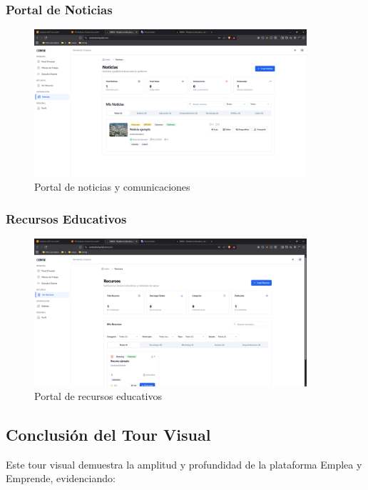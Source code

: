 \documentclass[12pt,a4paper]{article}
\begin{document}
\begin{enumerate}
\subsubsection{Portal de Noticias}
\begin{figure}[H]
    \centering
    \includegraphics[width=0.9\textwidth]{screenshots/features/news.png}
    \caption{Portal de noticias y comunicaciones}
    \label{fig:news}
\end{figure}

\subsubsection{Recursos Educativos}
\begin{figure}[H]
    \centering
    \includegraphics[width=0.9\textwidth]{screenshots/features/resources.png}
    \caption{Portal de recursos educativos}
    \label{fig:resources}
\end{figure}

\subsection{Conclusión del Tour Visual}

Este tour visual demuestra la amplitud y profundidad de la plataforma Emplea y Emprende, evidenciando:


\end{enumerate}
\end{document}
